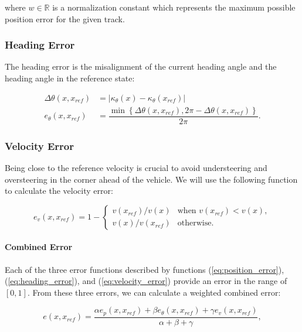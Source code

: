 where $w\in \mathbb{R}$ is a normalization constant which represents the maximum possible position error for the given track.

\subsubsection{Heading Error}

The heading error is the misalignment of the current heading angle and the heading angle in the reference state:

\begin{equation}
\label{eq:heading_error}
\begin{aligned}
	\Delta \theta(x, x_{ref}) &= |\kappa_\theta(x)-\kappa_\theta(x_{ref})| \\
	e_\theta(x, x_{ref}) &= \dfrac{\min\left\{\Delta \theta(x, x_{ref}), 2\pi - \Delta \theta(x, x_{ref})\right\}}{2\pi}.
\end{aligned}
\end{equation}

\subsubsection{Velocity Error}

Being close to the reference velocity is crucial to avoid understeering and oversteering in the corner ahead of the vehicle. We will use the following function to calculate the velocity error:

\begin{equation}
\label{eq:velocity_error}
e_v(x, x_{ref})=1-
	\begin{cases}
	v(x_{ref})/v(x) & \text{when } v(x_{ref})<v(x), \\
	v(x)/v(x_{ref}) & \text{otherwise}.
	\end{cases}
\end{equation}

\paragraph{Combined Error}

Each of the three error functions described by functions (\ref{eq:position_error}), (\ref{eq:heading_error}), and (\ref{eq:velocity_error}) provide an error in the range of $[0, 1]$. From these three errors, we can calculate a weighted combined error:

\[
	e(x, x_{ref})=\dfrac{\alpha e_p(x, x_{ref}) + \beta e_\theta(x, x_{ref}) + \gamma e_v(x, x_{ref})}{\alpha + \beta + \gamma},
\]

